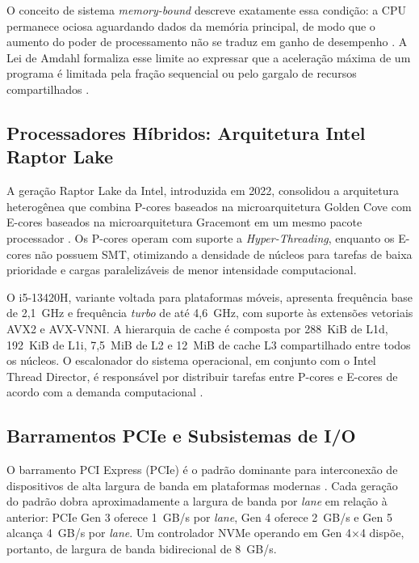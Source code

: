 \documentclass[12pt]{article}
\begin{document}
O conceito de sistema \textit{memory-bound} descreve exatamente essa condição: a CPU permanece ociosa aguardando dados da memória principal, de modo que o aumento do poder de processamento não se traduz em ganho de desempenho \cite{williams2009}. A Lei de Amdahl formaliza esse limite ao expressar que a aceleração máxima de um programa é limitada pela fração sequencial ou pelo gargalo de recursos compartilhados \cite{amdahl1967}.

\subsection{Processadores Híbridos: Arquitetura Intel Raptor Lake}

A geração Raptor Lake da Intel, introduzida em 2022, consolidou a arquitetura heterogênea que combina P-cores baseados na microarquitetura Golden Cove com E-cores baseados na microarquitetura Gracemont em um mesmo pacote processador \cite{intel2022raptorlake}. Os P-cores operam com suporte a \textit{Hyper-Threading}, enquanto os E-cores não possuem SMT, otimizando a densidade de núcleos para tarefas de baixa prioridade e cargas paralelizáveis de menor intensidade computacional.

O i5-13420H, variante voltada para plataformas móveis, apresenta frequência base de 2,1~GHz e frequência \textit{turbo} de até 4,6~GHz, com suporte às extensões vetoriais AVX2 e AVX-VNNI. A hierarquia de cache é composta por 288~KiB de L1d, 192~KiB de L1i, 7,5~MiB de L2 e 12~MiB de cache L3 compartilhado entre todos os núcleos. O escalonador do sistema operacional, em conjunto com o Intel Thread Director, é responsável por distribuir tarefas entre P-cores e E-cores de acordo com a demanda computacional \cite{intel2022threaddir}.

\subsection{Barramentos PCIe e Subsistemas de I/O}

O barramento PCI Express (PCIe) é o padrão dominante para interconexão de dispositivos de alta largura de banda em plataformas modernas \cite{budruk2003}. Cada geração do padrão dobra aproximadamente a largura de banda por \textit{lane} em relação à anterior: PCIe Gen 3 oferece 1~GB/s por \textit{lane}, Gen 4 oferece 2~GB/s e Gen 5 alcança 4~GB/s por \textit{lane}. Um controlador NVMe operando em Gen 4×4 dispõe, portanto, de largura de banda bidirecional de 8~GB/s.
\end{document}
